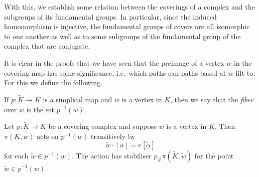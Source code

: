 With this, we establish some relation between the coverings of a complex and the subgroups of its fundamental groups. In particular, since the induced homomorphism is injective, the fundamental groups of covers are all isomorphic to one another as well as to some subgroups of the fundamental group of the complex that are conjugate.

It is clear in the proofs that we have seen that the preimage of a vertex $w$ in the covering map has some significance, i.e.\ which paths can paths based at $w$ lift to. For this we define the following.


\begin{definition}
  If $p:\tilde{K} \rightarrow K$ is a simplical map and $w$ is a vertex in $K$, then we say that the \emph{fiber} over $w$ is the set $p^{-1}(w)$.
\end{definition}

\begin{theorem}
  Let $p:\tilde{K} \rightarrow K$ be a covering complex and suppose $w$ is a vertex in $K$. Then $\pi(K,w)$ acts on $p^{-1}(w)$ transitively by
  \begin{equation*}
    {\tilde{w}}\cdot[\alpha] = e[\tilde{\alpha}]
  \end{equation*}
  for each $\tilde{w} \in p^{-1}(w)$. The action has stabiliser $p_{\#}\pi(\tilde{K},\tilde{w})$ for the point $\tilde{w} \in p^{-1}(w)$.
\end{theorem}

